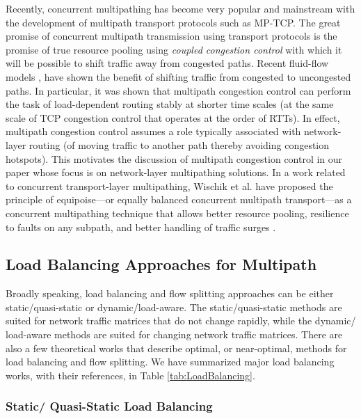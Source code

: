 \documentclass[10pt]{IEEEtran}
\begin{document}
Recently, concurrent multipathing has become very popular and mainstream with the development of multipath transport protocols such as MP-TCP. The great promise of concurrent multipath transmission using transport protocols is the promise of true resource pooling using \textit{coupled congestion control} \cite{raiciu2011coupled} with which it will be possible to shift traffic away from congested paths. Recent fluid-flow models \cite{kelly2005stability}, \cite{han2006multi} have shown the benefit of shifting traffic from congested to uncongested paths. In particular, it was shown that multipath congestion control can perform the task of load-dependent routing stably at shorter time scales (at the same scale of TCP congestion control that operates at the order of RTTs). In effect, multipath congestion control assumes a role typically associated with network-layer routing (of moving traffic to another path thereby avoiding congestion hotspots). This motivates the discussion of multipath congestion control in our paper whose focus is on network-layer multipathing solutions. In a work related to concurrent transport-layer multipathing, Wischik et al. have proposed the principle of equipoise---or equally balanced concurrent multipath transport---as a concurrent multipathing technique that allows better resource pooling, resilience to faults on any subpath,  and better handling of traffic surges \cite{wischik2010balancing}.  

\subsection{Load Balancing Approaches for Multipath}

Broadly speaking, load balancing and flow splitting approaches can be either static/quasi-static or dynamic/load-aware. The static/quasi-static methods are suited for network traffic matrices that do not change rapidly, while the dynamic/ load-aware methods are suited for changing network traffic matrices. There are also a few theoretical works that describe optimal, or near-optimal, methods for load balancing and flow splitting. We have summarized major load balancing works, with their references, in Table \ref{tab:LoadBalancing}. 

\subsubsection{Static/ Quasi-Static Load Balancing}
\label{subsubsec: static_appraoch}
\end{document}
